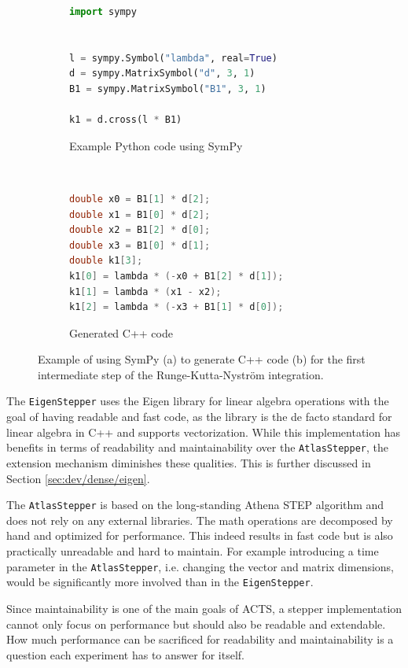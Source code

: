 \begin{figure}[ht]
    \centering
    \begin{subfigure}[t]{0.5\textwidth}
        \centering
        \begin{lstlisting}[language=Python,basicstyle=\tiny]
import sympy


l = sympy.Symbol("lambda", real=True)
d = sympy.MatrixSymbol("d", 3, 1)
B1 = sympy.MatrixSymbol("B1", 3, 1)

k1 = d.cross(l * B1)
        \end{lstlisting}
        \caption{Example Python code using SymPy}
    \end{subfigure}%
    ~
    \begin{subfigure}[t]{0.5\textwidth}
        \centering
        \begin{lstlisting}[language=C++,basicstyle=\tiny]
double x0 = B1[1] * d[2];
double x1 = B1[0] * d[2];
double x2 = B1[2] * d[0];
double x3 = B1[0] * d[1];
double k1[3];
k1[0] = lambda * (-x0 + B1[2] * d[1]);
k1[1] = lambda * (x1 - x2);
k1[2] = lambda * (-x3 + B1[1] * d[0]);
        \end{lstlisting}
        \caption{Generated C++ code}
    \end{subfigure}
    \caption{Example of using SymPy (a) to generate C++ code (b) for the first intermediate step of the Runge-Kutta-Nyström integration.}
    \label{fig:dev/stepper/sympy}
\end{figure}

The \texttt{EigenStepper} uses the Eigen library for linear algebra operations with the goal of having readable and fast code, as the library is the de facto standard for linear algebra in C++ and supports vectorization. While this implementation has benefits in terms of readability and maintainability over the \texttt{AtlasStepper}, the extension mechanism diminishes these qualities. This is further discussed in Section \ref{sec:dev/dense/eigen}.

The \texttt{AtlasStepper} is based on the long-standing Athena STEP algorithm and does not rely on any external libraries. The math operations are decomposed by hand and optimized for performance. This indeed results in fast code but is also practically unreadable and hard to maintain. For example introducing a time parameter in the \texttt{AtlasStepper}, i.e. changing the vector and matrix dimensions, would be significantly more involved than in the \texttt{EigenStepper}.

Since maintainability is one of the main goals of ACTS, a stepper implementation cannot only focus on performance but should also be readable and extendable. How much performance can be sacrificed for readability and maintainability is a question each experiment has to answer for itself.


